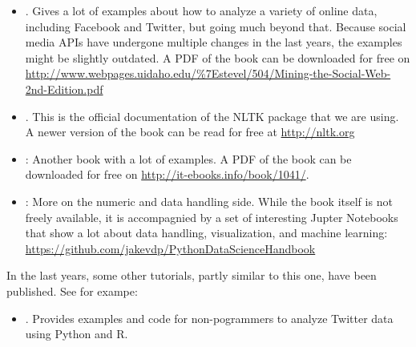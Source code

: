 \documentclass[a4paper,12pt]{book}
\begin{document}
\begin{itemize}
\item \citealp{Russel2013}. Gives a lot of examples about how to analyze a variety of online data, including Facebook and Twitter, but going much beyond that. Because social media APIs have undergone multiple changes in the last years, the examples might be slightly outdated. A PDF of the book can be downloaded for free on \url{http://www.webpages.uidaho.edu/\%7Estevel/504/Mining-the-Social-Web-2nd-Edition.pdf}
\item \citealp{Bird2009}. This is the official documentation of the NLTK package that we are using. A newer version of the book can be read for free at \url{http://nltk.org}
\item \citealp{McKinney2012}: Another book with a lot of examples. A PDF of the book can be downloaded for free on \url{http://it-ebooks.info/book/1041/}.
\item \citealp{Vanderplas2016}: More on the numeric and data handling side. While the book itself is not freely available, it is accompagnied by a set of interesting Jupter Notebooks that show a lot about data handling, visualization, and machine learning: \url{https://github.com/jakevdp/PythonDataScienceHandbook}
\end{itemize}

In the last years, some other tutorials, partly similar to this one, have been published. See for exampe:
\begin{itemize}
\item \citealp{Jurgens2016}. Provides examples and code for non-pogrammers to analyze Twitter data using Python and R.
\end{itemize}
\end{document}
